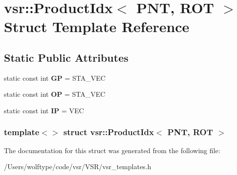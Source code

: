 \hypertarget{structvsr_1_1_product_idx_3_01_p_n_t_00_01_r_o_t_01_4}{\section{vsr\-:\-:Product\-Idx$<$ P\-N\-T, R\-O\-T $>$ Struct Template Reference}
\label{structvsr_1_1_product_idx_3_01_p_n_t_00_01_r_o_t_01_4}
}
\subsection*{Static Public Attributes}
\begin{DoxyCompactItemize}
\item 
\hypertarget{structvsr_1_1_product_idx_3_01_p_n_t_00_01_r_o_t_01_4_a5ae825e1438e805cabc29ba331060fc8}{static const int {\bfseries G\-P} = S\-T\-A\-\_\-\-V\-E\-C}\label{structvsr_1_1_product_idx_3_01_p_n_t_00_01_r_o_t_01_4_a5ae825e1438e805cabc29ba331060fc8}

\item 
\hypertarget{structvsr_1_1_product_idx_3_01_p_n_t_00_01_r_o_t_01_4_a50a3ad45b39cae4a75326a0507cd345a}{static const int {\bfseries O\-P} = S\-T\-A\-\_\-\-V\-E\-C}\label{structvsr_1_1_product_idx_3_01_p_n_t_00_01_r_o_t_01_4_a50a3ad45b39cae4a75326a0507cd345a}

\item 
\hypertarget{structvsr_1_1_product_idx_3_01_p_n_t_00_01_r_o_t_01_4_ab2d01758a7d0b8b54cacabd1c1cf08ff}{static const int {\bfseries I\-P} = V\-E\-C}\label{structvsr_1_1_product_idx_3_01_p_n_t_00_01_r_o_t_01_4_ab2d01758a7d0b8b54cacabd1c1cf08ff}

\end{DoxyCompactItemize}
\subsubsection*{template$<$$>$ struct vsr\-::\-Product\-Idx$<$ P\-N\-T, R\-O\-T $>$}



The documentation for this struct was generated from the following file\-:\begin{DoxyCompactItemize}
\item 
/\-Users/wolftype/code/vsr/\-V\-S\-R/vsr\-\_\-templates.\-h\end{DoxyCompactItemize}
